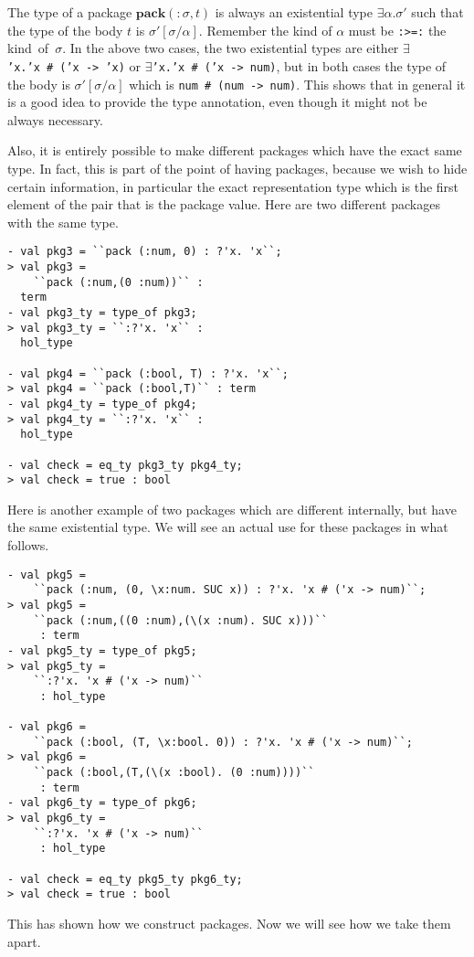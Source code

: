 The type of a package $\mathbf{pack}({:}\sigma, t)$
is always an existential type $\exists\alpha.\sigma'$
such
that the type of the body $t$ is $\sigma'[\sigma / \alpha]$.
Remember the kind of $\alpha$ must be \texttt{:>=:} the kind~of~$\sigma$.
In the above two cases, the 
two existential types
are either 
{\tt $\exists$'x.'x~\#~('x~->~'x)} or
{\tt $\exists$'x.'x~\#~('x~->~num)}, but in both cases the type of the 
body is $\sigma'[\sigma / \alpha]$ which is {\tt num~\#~(num~->~num)}.
This shows that in general it is a good idea to provide the type annotation,
even though it might not be always necessary.

Also, it is entirely possible to make different packages which
have the exact same type. In fact, this is part of the point of 
having packages, because we wish to hide certain information,
in particular the exact representation type which is the
first element of the pair that is the package value.
Here are two different packages with the same type.
\begin{session}
\begin{verbatim}
- val pkg3 = ``pack (:num, 0) : ?'x. 'x``;
> val pkg3 =
    ``pack (:num,(0 :num))`` :
  term
- val pkg3_ty = type_of pkg3;
> val pkg3_ty = ``:?'x. 'x`` :
  hol_type

- val pkg4 = ``pack (:bool, T) : ?'x. 'x``;
> val pkg4 = ``pack (:bool,T)`` : term
- val pkg4_ty = type_of pkg4;
> val pkg4_ty = ``:?'x. 'x`` :
  hol_type

- val check = eq_ty pkg3_ty pkg4_ty;
> val check = true : bool
\end{verbatim}
\end{session}

Here is another example of two packages which are different
internally, but have the same existential type.
We will see an actual use for these packages in what follows.
\begin{session}
\begin{verbatim}
- val pkg5 =
    ``pack (:num, (0, \x:num. SUC x)) : ?'x. 'x # ('x -> num)``;
> val pkg5 =
    ``pack (:num,((0 :num),(\(x :num). SUC x)))``
     : term
- val pkg5_ty = type_of pkg5;
> val pkg5_ty =
    ``:?'x. 'x # ('x -> num)``
     : hol_type

- val pkg6 =
    ``pack (:bool, (T, \x:bool. 0)) : ?'x. 'x # ('x -> num)``;
> val pkg6 =
    ``pack (:bool,(T,(\(x :bool). (0 :num))))``
     : term
- val pkg6_ty = type_of pkg6;
> val pkg6_ty =
    ``:?'x. 'x # ('x -> num)``
     : hol_type

- val check = eq_ty pkg5_ty pkg6_ty;
> val check = true : bool
\end{verbatim}
\end{session}
This has shown how we construct packages. Now we will see how we take them apart.

